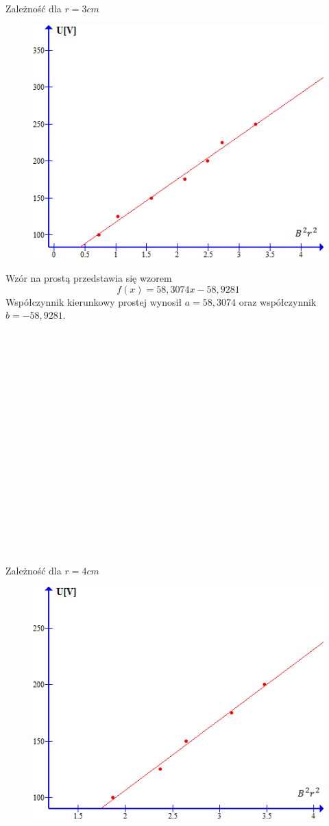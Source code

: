 \documentclass{article}
\begin{document}
Zależność dla $r = 3cm$
\begin{figure}[H]
\centering
\includegraphics[width=15cm]{wykres2.png}
\end{figure}
Wzór na prostą przedstawia się wzorem
$$ f(x) = 58,3074x - 58,9281$$
Współczynnik kierunkowy prostej wynosił $a = 58,3074$ oraz współczynnik $b = -58,9281$.\\\\\\\\\\\\\\\\\\\\\\\\\\\\\\\\\\\\\\
Zależność dla $r = 4cm$
\begin{figure}[H]
\centering
\includegraphics[width=15cm]{wykres3.png}
\end{figure}
\end{document}

